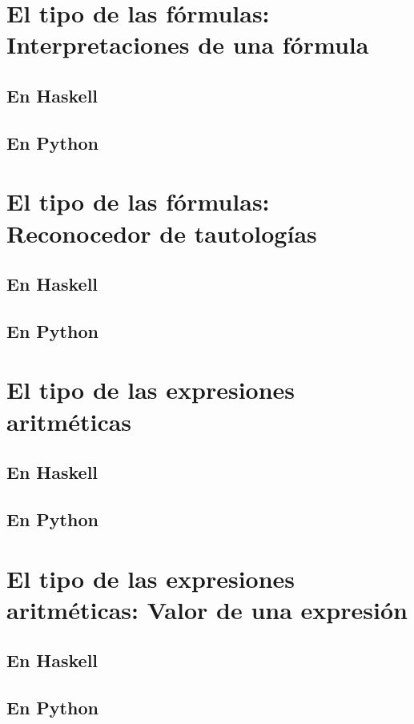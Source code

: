 \documentclass[a4paper,12pt,twoside]{book}
\begin{document}
\section{El tipo de las fórmulas: Interpretaciones de una fórmula}
\subsection*{En Haskell}
\subsection*{En Python}

\section{El tipo de las fórmulas: Reconocedor de tautologías}
\subsection*{En Haskell}
\subsection*{En Python}

\section{El tipo de las expresiones aritméticas}
\subsection{En Haskell}
\subsection{En Python}

\section{El tipo de las expresiones aritméticas: Valor de una expresión}
\subsection*{En Haskell}
\subsection*{En Python}
\end{document}
